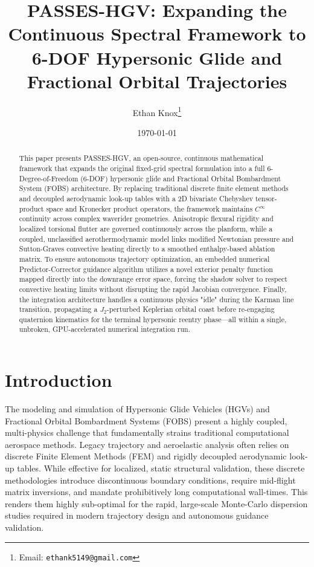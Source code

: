 \documentclass[11pt,a4paper]{article}
\title{PASSES-HGV: Expanding the Continuous Spectral Framework to 6-DOF Hypersonic Glide and Fractional Orbital Trajectories}
\author[1]{Ethan Knox\thanks{Email: \texttt{ethank5149@gmail.com}}}
\affil[1]{Independent Researcher, Champaign, IL, USA}
\date{\today}
\theoremstyle{definition}
\numberwithin{equation}{section}
\begin{document}
\maketitle

\begin{abstract}
This paper presents PASSES-HGV, an open-source, continuous mathematical framework that expands the original fixed-grid spectral formulation into a full 6-Degree-of-Freedom (6-DOF) hypersonic glide and Fractional Orbital Bombardment System (FOBS) architecture. By replacing traditional discrete finite element methods and decoupled aerodynamic look-up tables with a 2D bivariate Chebyshev tensor-product space and Kronecker product operators, the framework maintains $C^\infty$ continuity across complex waverider geometries. Anisotropic flexural rigidity and localized torsional flutter are governed continuously across the planform, while a coupled, unclassified aerothermodynamic model links modified Newtonian pressure and Sutton-Graves convective heating directly to a smoothed enthalpy-based ablation matrix. To ensure autonomous trajectory optimization, an embedded numerical Predictor-Corrector guidance algorithm utilizes a novel exterior penalty function mapped directly into the downrange error space, forcing the shadow solver to respect convective heating limits without disrupting the rapid Jacobian convergence. Finally, the integration architecture handles a continuous physics "idle" during the Karman line transition, propagating a $J_2$-perturbed Keplerian orbital coast before re-engaging quaternion kinematics for the terminal hypersonic reentry phase—all within a single, unbroken, GPU-accelerated numerical integration run.
\end{abstract}

\pagebreak

\section{Introduction}
\label{sec:intro}
The modeling and simulation of Hypersonic Glide Vehicles (HGVs) and Fractional Orbital Bombardment Systems (FOBS) present a highly coupled, multi-physics challenge that fundamentally strains traditional computational aerospace methods. Legacy trajectory and aeroelastic analysis often relies on discrete Finite Element Methods (FEM) and rigidly decoupled aerodynamic look-up tables. While effective for localized, static structural validation, these discrete methodologies introduce discontinuous boundary conditions, require mid-flight matrix inversions, and mandate prohibitively long computational wall-times. This renders them highly sub-optimal for the rapid, large-scale Monte-Carlo dispersion studies required in modern trajectory design and autonomous guidance validation.
\end{document}
